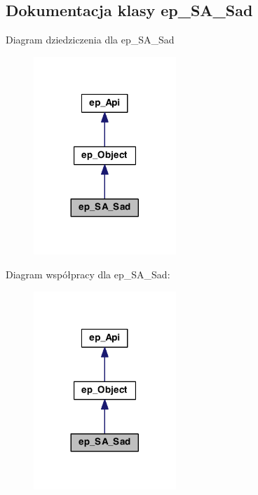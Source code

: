 \hypertarget{classep___s_a___sad}{\subsection{Dokumentacja klasy ep\-\_\-\-S\-A\-\_\-\-Sad}
\label{classep___s_a___sad}
}


Diagram dziedziczenia dla ep\-\_\-\-S\-A\-\_\-\-Sad\nopagebreak
\begin{figure}[H]
\begin{center}
\leavevmode
\includegraphics[width=152pt]{classep___s_a___sad__inherit__graph}
\end{center}
\end{figure}


Diagram współpracy dla ep\-\_\-\-S\-A\-\_\-\-Sad\-:\nopagebreak
\begin{figure}[H]
\begin{center}
\leavevmode
\includegraphics[width=152pt]{classep___s_a___sad__coll__graph}
\end{center}
\end{figure}
